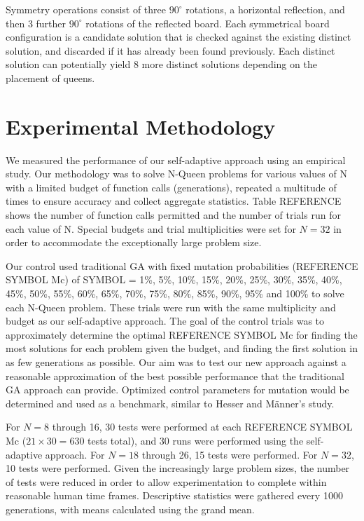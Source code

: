 \documentclass[conference]{IEEEtran}
\begin{document}
Symmetry operations consist of three $90^{\circ}$ rotations, a horizontal reflection, and then 3 further $90^{\circ}$ rotations of the reflected board. Each symmetrical board configuration is a candidate solution that is checked against the existing distinct solution, and discarded if it has already been found previously. Each distinct solution can potentially yield 8 more distinct solutions depending on the placement of queens.

\section{Experimental Methodology}
We measured the performance of our self-adaptive approach using an empirical study. Our methodology was to solve N-Queen problems for various values of N with a limited budget of function calls (generations), repeated a multitude of times to ensure accuracy and collect aggregate statistics. Table {REFERENCE} shows the number of function calls permitted and the number of trials run for each value of N. Special budgets and trial multiplicities were set for $N = 32$ in order to accommodate the exceptionally large problem size.

Our control used traditional GA with fixed mutation probabilities ({REFERENCE SYMBOL Mc}) of {SYMBOL} = 1\%, 5\%, 10\%, 15\%, 20\%, 25\%, 30\%, 35\%, 40\%, 45\%, 50\%, 55\%, 60\%, 65\%, 70\%, 75\%, 80\%, 85\%, 90\%, 95\% and 100\% to solve each N-Queen problem. These trials were run with the same multiplicity and budget as our self-adaptive approach. The goal of the control trials was to approximately determine the optimal {REFERENCE SYMBOL Mc} for finding the most solutions for each problem given the budget, and finding the first solution in as few generations as possible. Our aim was to test our new approach against a reasonable approximation of the best possible performance that the traditional GA approach can provide. Optimized control parameters for mutation would be determined and used as a benchmark, similar to Hesser and M\"{a}nner's study.

For $N = 8$ through 16, 30 tests were performed at each {REFERENCE SYMBOL Mc} ($21 \times 30 = 630$ tests total), and 30 runs were performed using the self-adaptive approach. For $N = 18$ through 26, 15 tests were performed. For $N = 32$, 10 tests were performed. Given the increasingly large problem sizes, the number of tests were reduced in order to allow experimentation to complete within reasonable human time frames. Descriptive statistics were gathered every 1000 generations, with means calculated using the grand mean.
\end{document}
